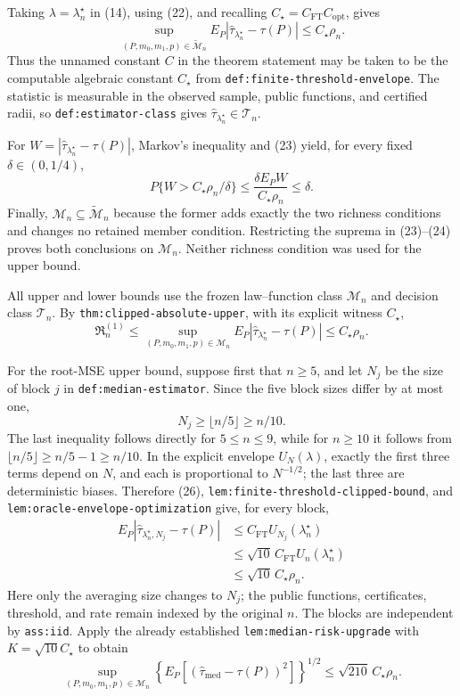 Taking \(\lambda=\lambda_n^\star\) in (14), using (22), and recalling
\(C_\star=C_{\mathrm{FT}}C_{\mathrm{opt}}\), gives
\[
\sup_{(P,m_0,m_1,p)\in\widetilde{\mathcal M}_n}
E_P|\widehat\tau_{\lambda_n^\star}-\tau(P)|
\leq C_\star\rho_n.                                               \tag{23}
\]
Thus the unnamed constant \(C\) in the theorem statement may be taken to be
the computable algebraic constant \(C_\star\) from
\texttt{def:finite-threshold-envelope}.  The statistic is measurable in the
observed sample, public functions, and certified radii, so
\texttt{def:estimator-class} gives
\(\widehat\tau_{\lambda_n^\star}\in\mathcal T_n\).

For \(W=|\widehat\tau_{\lambda_n^\star}-\tau(P)|\), Markov's inequality and
(23) yield, for every fixed \(\delta\in(0,1/4)\),
\[
P\{W>C_\star\rho_n/\delta\}
\leq\frac{\delta E_PW}{C_\star\rho_n}\leq\delta.                   \tag{24}
\]
Finally, \(\mathcal M_n\subseteq\widetilde{\mathcal M}_n\) because the former
adds exactly the two richness conditions and changes no retained member
condition.  Restricting the suprema in (23)--(24) proves both conclusions on
\(\mathcal M_n\).  Neither richness condition was used for the upper bound.

All upper and lower bounds use the frozen law--function class
\(\mathcal M_n\) and decision class \(\mathcal T_n\).  By
\texttt{thm:clipped-absolute-upper}, with its explicit witness
\(C_\star\),
\[
\mathfrak R_n^{(1)}
\leq\sup_{(P,m_0,m_1,p)\in\mathcal M_n}
E_P|\widehat\tau_{\lambda_n^\star}-\tau(P)|
\leq C_\star\rho_n.                                               \tag{25}
\]

For the root-MSE upper bound, suppose first that \(n\geq5\), and let \(N_j\)
be the size of block \(j\) in \texttt{def:median-estimator}.  Since the five
block sizes differ by at most one,
\[
N_j\geq\lfloor n/5\rfloor\geq n/10.                               \tag{26}
\]
The last inequality follows directly for \(5\leq n\leq9\), while for
\(n\geq10\) it follows from
\(\lfloor n/5\rfloor\geq n/5-1\geq n/10\).  In the explicit envelope
\(U_N(\lambda)\), exactly the first three terms depend on \(N\), and each is
proportional to \(N^{-1/2}\); the last three are deterministic biases.
Therefore (26), \texttt{lem:finite-threshold-clipped-bound}, and \texttt{lem:oracle-envelope-optimization} give, for every block,
\[
\begin{split}
E_P|\widehat\tau_{\lambda_n^\star,N_j}-\tau(P)|
&\leq C_{\mathrm{FT}}U_{N_j}(\lambda_n^\star)\\
&\leq\sqrt{10}\,C_{\mathrm{FT}}U_n(\lambda_n^\star)\\
&\leq\sqrt{10}\,C_\star\rho_n.
\end{split} \tag{27}
\]
Here only the averaging size changes to \(N_j\); the public functions,
certificates, threshold, and rate remain indexed by the original \(n\).
The blocks are independent by \texttt{ass:iid}.  Apply the already established
\texttt{lem:median-risk-upgrade} with
\(K=\sqrt{10}C_\star\) to obtain
\[
\sup_{(P,m_0,m_1,p)\in\mathcal M_n}
\left\{E_P[(\widehat\tau_{\mathrm{med}}-\tau(P))^2]\right\}^{1/2}
\leq\sqrt{210}\,C_\star\rho_n.                                   \tag{28}
\]

